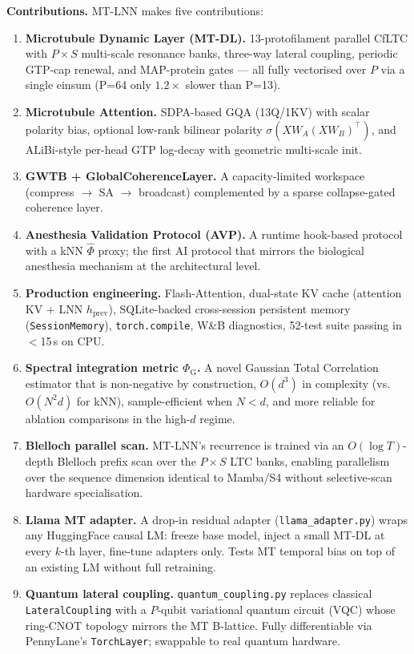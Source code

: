 \documentclass[11pt]{article}
\theoremstyle{definition}
\newcommand{\sigmoid}{\sigma}
\newcommand{\phihat}{\hat{\Phi}}
\newcommand{\phig}{\Phi_{\mathrm{G}}}
\begin{document}
\medskip\noindent\textbf{Contributions.} MT-LNN makes five contributions:
\begin{enumerate}[label=\textbf{C\arabic*},leftmargin=*]
  \item \textbf{Microtubule Dynamic Layer (MT-DL).} 13-protofilament parallel CfLTC with $P\!\times\!S$ multi-scale resonance banks, three-way lateral coupling, periodic GTP-cap renewal, and MAP-protein gates — all fully vectorised over $P$ via a single einsum (P=64 only $1.2\times$ slower than P=13).
  \item \textbf{Microtubule Attention.} SDPA-based GQA (13Q/1KV) with scalar polarity bias, optional low-rank bilinear polarity $\sigmoid(XW_A(XW_B)^\top)$, and ALiBi-style per-head GTP log-decay with geometric multi-scale init.
  \item \textbf{GWTB + GlobalCoherenceLayer.} A capacity-limited workspace (compress $\to$ SA $\to$ broadcast) complemented by a sparse collapse-gated coherence layer.
  \item \textbf{Anesthesia Validation Protocol (AVP).} A runtime hook-based protocol with a kNN $\phihat$ proxy; the first AI protocol that mirrors the biological anesthesia mechanism at the architectural level.
  \item \textbf{Production engineering.} Flash-Attention, dual-state KV cache (attention KV + LNN $h_\text{prev}$), SQLite-backed cross-session persistent memory (\texttt{SessionMemory}), \texttt{torch.compile}, W\&B diagnostics, 52-test suite passing in $<$15\,s on CPU.
  \item \textbf{Spectral integration metric $\phig$.} A novel Gaussian Total Correlation estimator that is non-negative by construction, $O(d^3)$ in complexity (vs.\ $O(N^2 d)$ for kNN), sample-efficient when $N < d$, and more reliable for ablation comparisons in the high-$d$ regime.
  \item \textbf{Blelloch parallel scan.} MT-LNN's recurrence is trained via an $O(\log T)$-depth Blelloch prefix scan over the $P{\times}S$ LTC banks, enabling parallelism over the sequence dimension identical to Mamba/S4 without selective-scan hardware specialisation.
  \item \textbf{Llama MT adapter.} A drop-in residual adapter (\texttt{llama\_adapter.py}) wraps any HuggingFace causal LM: freeze base model, inject a small MT-DL at every $k$-th layer, fine-tune adapters only. Tests MT temporal bias on top of an existing LM without full retraining.
  \item \textbf{Quantum lateral coupling.} \texttt{quantum\_coupling.py} replaces classical \texttt{LateralCoupling} with a $P$-qubit variational quantum circuit (VQC) whose ring-CNOT topology mirrors the MT B-lattice. Fully differentiable via PennyLane's \texttt{TorchLayer}; swappable to real quantum hardware.
\end{enumerate}
\end{document}
